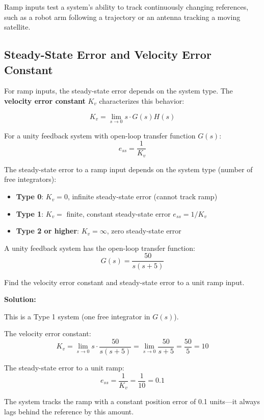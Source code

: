 Ramp inputs test a system's ability to track continuously changing references, such as a robot arm following a trajectory or an antenna tracking a moving satellite.

\subsection{Steady-State Error and Velocity Error Constant}

For ramp inputs, the steady-state error depends on the system type. The \textbf{velocity error constant} $K_v$ characterizes this behavior:

\begin{equation}
K_v = \lim_{s \to 0} s \cdot G(s)H(s)
\end{equation}

For a unity feedback system with open-loop transfer function $G(s)$:
\begin{equation}
e_{ss} = \frac{1}{K_v}
\end{equation}

\begin{warningbox}[title=System Type and Ramp Response]
The steady-state error to a ramp input depends on the system type (number of free integrators):
\begin{itemize}
    \item \textbf{Type 0}: $K_v = 0$, infinite steady-state error (cannot track ramp)
    \item \textbf{Type 1}: $K_v = $ finite, constant steady-state error $e_{ss} = 1/K_v$
    \item \textbf{Type 2 or higher}: $K_v = \infty$, zero steady-state error
\end{itemize}
\end{warningbox}

\begin{examplebox}[title=Example 6.3: Ramp Response and Velocity Error]
A unity feedback system has the open-loop transfer function:
\begin{equation}
G(s) = \frac{50}{s(s + 5)}
\end{equation}

Find the velocity error constant and steady-state error to a unit ramp input.

\textbf{Solution:}

This is a Type 1 system (one free integrator in $G(s)$).

The velocity error constant:
\begin{equation}
K_v = \lim_{s \to 0} s \cdot \frac{50}{s(s + 5)} = \lim_{s \to 0} \frac{50}{s + 5} = \frac{50}{5} = 10
\end{equation}

The steady-state error to a unit ramp:
\begin{equation}
e_{ss} = \frac{1}{K_v} = \frac{1}{10} = 0.1
\end{equation}

The system tracks the ramp with a constant position error of 0.1 units---it always lags behind the reference by this amount.
\end{examplebox}

